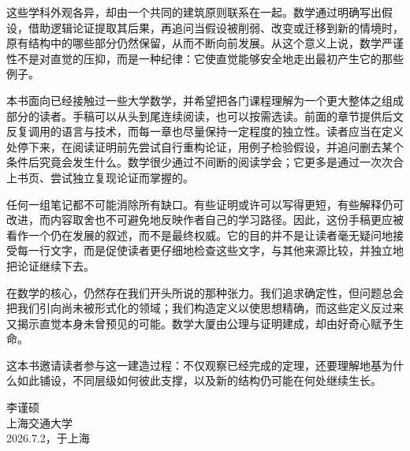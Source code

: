 这些学科外观各异，却由一个共同的建筑原则联系在一起。数学通过明确写出假设，借助逻辑论证提取其后果，再追问当假设被削弱、改变或迁移到新的情境时，原有结构中的哪些部分仍然保留，从而不断向前发展。从这个意义上说，数学严谨性不是对直觉的压抑，而是一种纪律：它使直觉能够安全地走出最初产生它的那些例子。

本书面向已经接触过一些大学数学，并希望把各门课程理解为一个更大整体之组成部分的读者。手稿可以从头到尾连续阅读，也可以按需选读。前面的章节提供后文反复调用的语言与技术，而每一章也尽量保持一定程度的独立性。读者应当在定义处停下来，在阅读证明前先尝试自行重构论证，用例子检验假设，并追问删去某个条件后究竟会发生什么。数学很少通过不间断的阅读学会；它更多是通过一次次合上书页、尝试独立复现论证而掌握的。

任何一组笔记都不可能消除所有缺口。有些证明或许可以写得更短，有些解释仍可改进，而内容取舍也不可避免地反映作者自己的学习路径。因此，这份手稿更应被看作一个仍在发展的叙述，而不是最终权威。它的目的并不是让读者毫无疑问地接受每一行文字，而是促使读者更仔细地检查这些文字，与其他来源比较，并独立地把论证继续下去。

在数学的核心，仍然存在我们开头所说的那种张力。我们追求确定性，但问题总会把我们引向尚未被形式化的领域；我们构造定义以使思想精确，而这些定义反过来又揭示直觉本身未曾预见的可能。数学大厦由公理与证明建成，却由好奇心赋予生命。

这本书邀请读者参与这一建造过程：不仅观察已经完成的定理，还要理解地基为什么如此铺设，不同层级如何彼此支撑，以及新的结构仍可能在何处继续生长。

\begin{flushright}
李谨硕 \\
上海交通大学 \\
2026.7.2，于上海
\end{flushright}
